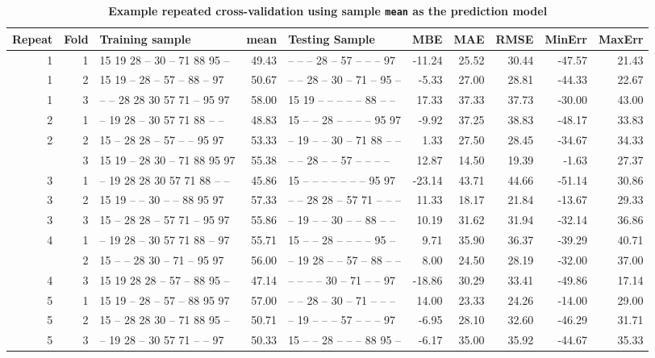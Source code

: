 \documentclass[
]{book}
\begin{document}
\begin{table}

\caption{\label{tab:repeated-cross-validation}\textbf{Example repeated cross-validation using sample \texttt{mean} as the prediction model}}
\centering
\begin{tabular}[t]{rrlrlrrrrr}
\toprule
Repeat & Fold & Training sample & mean & Testing Sample & MBE & MAE & RMSE & MinErr & MaxErr\\
\midrule
1 & 1 & 15  19  28  --  30  --  71  88  95  -- & 49.43 & --  --  --  28  --  57  --  --  --  97 & -11.24 & 25.52 & 30.44 & -47.57 & 21.43\\
1 & 2 & 15  19  --  28  --  57  --  88  --  97 & 50.67 & --  --  28  --  30  --  71  --  95  -- & -5.33 & 27.00 & 28.81 & -44.33 & 22.67\\
1 & 3 & --  --  28  28  30  57  71  --  95  97 & 58.00 & 15  19  --  --  --  --  --  88  --  -- & 17.33 & 37.33 & 37.73 & -30.00 & 43.00\\
2 & 1 & --  19  28  --  30  57  71  88  --  -- & 48.83 & 15  --  --  28  --  --  --  --  95  97 & -9.92 & 37.25 & 38.83 & -48.17 & 33.83\\
2 & 2 & 15  --  28  28  --  57  --  --  95  97 & 53.33 & --  19  --  --  30  --  71  88  --  -- & 1.33 & 27.50 & 28.45 & -34.67 & 34.33\\
\addlinespace
2 & 3 & 15  19  --  28  30  --  71  88  95  97 & 55.38 & --  --  28  --  --  57  --  --  --  -- & 12.87 & 14.50 & 19.39 & -1.63 & 27.37\\
3 & 1 & --  19  28  28  30  57  71  88  --  -- & 45.86 & 15  --  --  --  --  --  --  --  95  97 & -23.14 & 43.71 & 44.66 & -51.14 & 30.86\\
3 & 2 & 15  19  --  --  30  --  --  88  95  97 & 57.33 & --  --  28  28  --  57  71  --  --  -- & 11.33 & 18.17 & 21.84 & -13.67 & 29.33\\
3 & 3 & 15  --  28  28  --  57  71  --  95  97 & 55.86 & --  19  --  --  30  --  --  88  --  -- & 10.19 & 31.62 & 31.94 & -32.14 & 36.86\\
4 & 1 & --  19  28  --  30  57  71  88  --  97 & 55.71 & 15  --  --  28  --  --  --  --  95  -- & 9.71 & 35.90 & 36.37 & -39.29 & 40.71\\
\addlinespace
4 & 2 & 15  --  --  28  30  --  71  --  95  97 & 56.00 & --  19  28  --  --  57  --  88  --  -- & 8.00 & 24.50 & 28.19 & -32.00 & 37.00\\
4 & 3 & 15  19  28  28  --  57  --  88  95  -- & 47.14 & --  --  --  --  30  --  71  --  --  97 & -18.86 & 30.29 & 33.41 & -49.86 & 17.14\\
5 & 1 & 15  19  --  28  --  57  --  88  95  97 & 57.00 & --  --  28  --  30  --  71  --  --  -- & 14.00 & 23.33 & 24.26 & -14.00 & 29.00\\
5 & 2 & 15  --  28  28  30  --  71  88  95  -- & 50.71 & --  19  --  --  --  57  --  --  --  97 & -6.95 & 28.10 & 32.60 & -46.29 & 31.71\\
5 & 3 & --  19  28  --  30  57  71  --  --  97 & 50.33 & 15  --  --  28  --  --  --  88  95  -- & -6.17 & 35.00 & 35.92 & -44.67 & 35.33\\
\bottomrule
\end{tabular}
\end{table}
\end{document}
